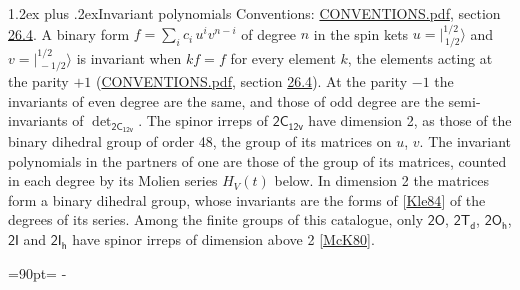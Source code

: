 \documentclass[10pt,a4paper]{article}
\makeatletter
\renewcommand\section{\@startsection{section}{1}{\z@}{-3ex plus -1ex minus -.2ex}%
  {1.2ex plus .2ex}{\normalfont\large\sffamily\bfseries\color{parttitle}}}
\newcommand{\needspace}[1]{\par\penalty-100\begingroup\dimen0=#1\relax\dimen2=\pagegoal
  \advance\dimen2-\pagetotal\ifdim\dimen0>\dimen2\relax\ifdim\dimen2>0pt\vfil\break\fi\fi
  \endgroup}
\numberwithin{equation}{section}
\newcommand{\grp}[1]{\mathsf{#1}}
\newcommand{\jm}[2]{\bigl\lvert{}^{#1}_{\,#2}\bigr\rangle}
\makeatother
\begin{document}
\section{Invariant polynomials}\label{s:invariants}
Conventions: \href{../../CONVENTIONS.pdf}{CONVENTIONS.pdf}, section \href{../../CONVENTIONS.pdf\#conv.26.4}{26.4}.
\leavevmode\label{n:local.binary.form}A binary form $f = \sum_i c_i\, u^i v^{n-i}$ of degree $n$ in the spin kets $u = \jm{1/2}{1/2}$ and $v = \jm{1/2}{-1/2}$ is invariant when $k f = f$ for every element $k$, the elements acting at the parity $+1$ (\href{../../CONVENTIONS.pdf}{CONVENTIONS.pdf}, section \href{../../CONVENTIONS.pdf\#conv.26.4}{26.4}). At the parity $-1$ the invariants of even degree are the same, and those of odd degree are the semi-invariants of $\det_{\grp{2C_{12v}}}$.
The spinor irreps of $\grp{2C_{12v}}$ have dimension 2, as those of the binary dihedral group of order 48, the group of its matrices on $u$, $v$. \label{n:function.hilbert}The invariant polynomials in the partners of one are those of the group of its matrices, counted in each degree by its Molien series $H_V(t)$ below. In dimension 2 the matrices form a binary dihedral group, whose invariants are the forms of [\href{../../../REFERENCES.pdf\#ref.Kle84}{Kle84}] of the degrees of its series. Among the finite groups of this catalogue, only $\grp{2O}$, $\grp{2T_{d}}$, $\grp{2O_{h}}$, $\grp{2I}$ and $\grp{2I_{h}}$ have spinor irreps of dimension above 2 [\href{../../../REFERENCES.pdf\#ref.McK80}{McK80}].
\needspace{90pt}
\end{document}
